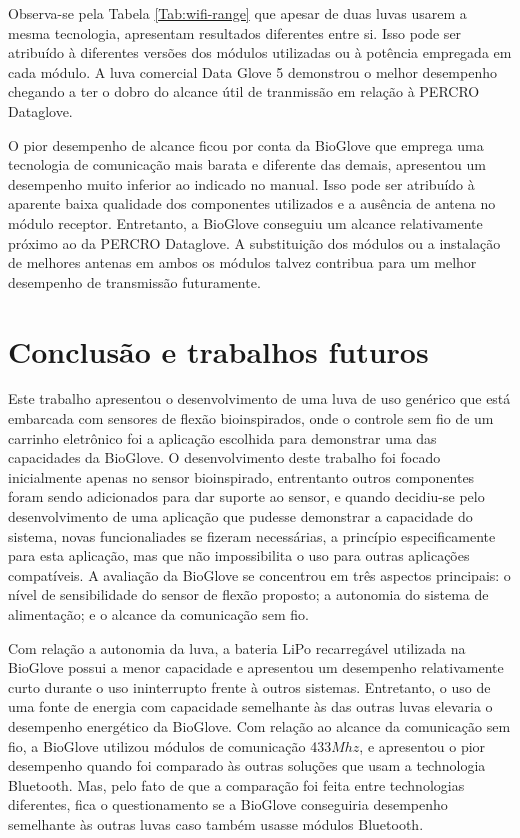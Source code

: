 \documentclass[
	12pt,				%
	openright,			%
	oneside,			%
	a4paper,			%
	english,			%
	brazil				%
	]{abntex2}
\begin{document}
			Observa-se pela Tabela \ref{Tab:wifi-range} que apesar de duas luvas usarem a mesma tecnologia, apresentam resultados diferentes entre si. Isso pode ser atribuído à diferentes versões dos módulos utilizadas ou à potência empregada em cada módulo. A luva comercial Data Glove 5 demonstrou o melhor desempenho chegando a ter o dobro do alcance útil de tranmissão em relação à PERCRO Dataglove.

			O pior desempenho de alcance ficou por conta da BioGlove que emprega uma tecnologia de comunicação mais barata e diferente das demais, apresentou um desempenho muito inferior ao indicado no manual. Isso pode ser atribuído à aparente baixa qualidade dos componentes utilizados e a ausência de antena no módulo receptor. Entretanto, a BioGlove conseguiu um alcance relativamente próximo ao da PERCRO Dataglove. A substituição dos módulos ou a instalação de melhores antenas em ambos os módulos talvez contribua para um melhor desempenho de transmissão futuramente.





		\chapter{Conclusão e trabalhos futuros}
		
		Este trabalho apresentou o desenvolvimento de uma luva de uso genérico que está embarcada com sensores de flexão bioinspirados, onde o controle sem fio de um carrinho eletrônico foi a aplicação escolhida para demonstrar uma das capacidades da BioGlove. O desenvolvimento deste trabalho foi focado inicialmente apenas no sensor bioinspirado, entrentanto outros componentes foram sendo adicionados para dar suporte ao sensor, e quando decidiu-se pelo desenvolvimento de uma aplicação que pudesse demonstrar a capacidade do sistema, novas funcionaliades se fizeram necessárias, a princípio especificamente para esta aplicação, mas que não impossibilita o uso para outras aplicações compatíveis. A avaliação da BioGlove se concentrou em três aspectos principais: o nível de sensibilidade do sensor de flexão proposto; a autonomia do sistema de alimentação; e o alcance da comunicação sem fio.

		Com relação a autonomia da luva, a bateria LiPo recarregável utilizada na BioGlove possui a menor capacidade e apresentou um desempenho relativamente curto durante o uso ininterrupto frente à outros sistemas. Entretanto, o uso de uma fonte de energia com capacidade semelhante às das outras luvas elevaria o desempenho energético da BioGlove. Com relação ao alcance da comunicação sem fio, a BioGlove utilizou módulos de comunicação 433$Mhz$, e apresentou o pior desempenho quando foi comparado às outras soluções que usam a technologia Bluetooth. Mas, pelo fato de que a comparação foi feita entre technologias diferentes, fica o questionamento se a BioGlove conseguiria desempenho semelhante às outras luvas caso também usasse módulos Bluetooth.
\end{document}
